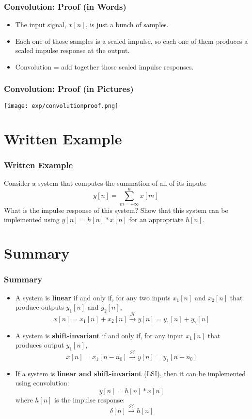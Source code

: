 \documentclass{beamer}
\begin{document}
\begin{frame}
  \frametitle{Convolution: Proof (in Words)}

  \begin{itemize}
  \item The input signal, $x[n]$, is just a bunch of samples.
  \item Each one of those samples is a scaled impulse, so each one of
    them produces a scaled impulse response at the output.
  \item Convolution = add together those scaled impulse responses.
  \end{itemize}
\end{frame}


\begin{frame}
  \frametitle{Convolution: Proof (in Pictures)}

  \centerline{\texttt{[image: exp/convolutionproof.png]}}
\end{frame}

\section[Example]{Written Example}
\setcounter{subsection}{1}

\begin{frame}
  \frametitle{Written Example}

  Consider a system that computes the summation of all of its inputs:
  \[
  y[n] = \sum_{m=-\infty}^n x[m]
  \]
  What is the impulse response of this system?  Show that this system can be implemented using
  $y[n]=h[n]\ast x[n]$ for an appropriate $h[n]$.
\end{frame}

\section[Summary]{Summary}
\setcounter{subsection}{1}

\begin{frame}
  \frametitle{Summary}
  \begin{itemize}
  \item A system is {\bf linear} if and only if, for any two inputs
    $x_1[n]$ and $x_2[n]$ that produce outputs $y_1[n]$ and $y_2[n]$,
    \[
    x[n]=x_1[n]+x_2[n] \stackrel{\mathcal H}{\longrightarrow}  y[n]=y_1[n]+y_2[n]
    \]
  \item A system is {\bf shift-invariant} if and only if, for any input
    $x_1[n]$ that produces output $y_1[n]$,
    \[
    x[n]=x_1[n-n_0] \stackrel{\mathcal H}{\longrightarrow}  y[n]=y_1[n-n_0]
    \]
  \item If a system is {\bf linear and shift-invariant} (LSI), then it
    can be implemented using convolution:
    \[
    y[n] = h[n]\ast x[n]
    \]
    where $h[n]$ is the impulse response:
    \[
    \delta[n] \stackrel{\mathcal H}{\longrightarrow}  h[n]
    \]
  \end{itemize}
\end{frame}
    
\end{document}

